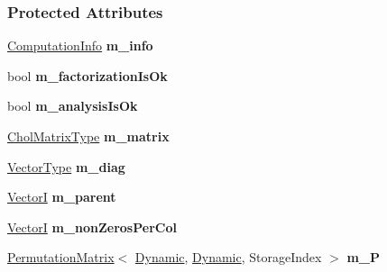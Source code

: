 \subsubsection*{Protected Attributes}
\begin{DoxyCompactItemize}
\item 
\mbox{\label{group___sparse_cholesky___module_aef0a9f5e4c5ad1f4cfdacbdf86fcb47e}} 
\hyperlink{group__enums_ga85fad7b87587764e5cf6b513a9e0ee5e}{Computation\+Info} {\bfseries m\+\_\+info}
\item 
\mbox{\label{group___sparse_cholesky___module_adbfcfc2fd1df1aaa4252c7da0deae2c7}} 
bool {\bfseries m\+\_\+factorization\+Is\+Ok}
\item 
\mbox{\label{group___sparse_cholesky___module_a3c671aff69118813fca76289d629c783}} 
bool {\bfseries m\+\_\+analysis\+Is\+Ok}
\item 
\mbox{\label{group___sparse_cholesky___module_a6383546ce2c77c195307309692e719d4}} 
\hyperlink{group___sparse_core___module}{Chol\+Matrix\+Type} {\bfseries m\+\_\+matrix}
\item 
\mbox{\label{group___sparse_cholesky___module_aadcb7c6e49ee6e311b04210cff8d895a}} 
\hyperlink{group___core___module}{Vector\+Type} {\bfseries m\+\_\+diag}
\item 
\mbox{\label{group___sparse_cholesky___module_a1783f1f0f212b3194a5395c270b992f0}} 
\hyperlink{group___core___module}{VectorI} {\bfseries m\+\_\+parent}
\item 
\mbox{\label{group___sparse_cholesky___module_ad51c38bfabe26bf3b6308fc9927b6683}} 
\hyperlink{group___core___module}{VectorI} {\bfseries m\+\_\+non\+Zeros\+Per\+Col}
\item 
\mbox{\label{group___sparse_cholesky___module_a84abb86c0483f122993e835fbcb574fe}} 
\hyperlink{group___core___module_class_eigen_1_1_permutation_matrix}{Permutation\+Matrix}$<$ \hyperlink{namespace_eigen_ad81fa7195215a0ce30017dfac309f0b2}{Dynamic}, \hyperlink{namespace_eigen_ad81fa7195215a0ce30017dfac309f0b2}{Dynamic}, Storage\+Index $>$ {\bfseries m\+\_\+P}

\end{DoxyCompactItemize}
